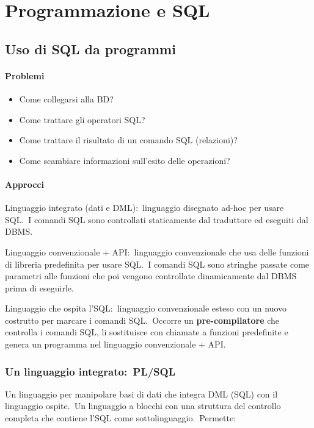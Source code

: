 \chapter{Programmazione e SQL}

\section{Uso di SQL da programmi}

\subsubsection{Problemi}

\begin{itemize}
	\item Come collegarsi alla BD?
	\item Come trattare gli operatori SQL?
	\item Come trattare il risultato di un comando SQL (relazioni)?
	\item Come scambiare informazioni sull'esito delle operazioni?
\end{itemize}

\subsubsection{Approcci}

Linguaggio integrato (dati e DML):\ linguaggio disegnato ad-hoc per usare SQL.\
I comandi SQL sono controllati staticamente dal traduttore ed eseguiti dal DBMS.

\noindent Linguaggio convenzionale + API:\ linguaggio convenzionale che usa delle funzioni di libreria predefinita per usare SQL.\
I comandi SQL sono stringhe passate come parametri alle funzioni che poi vengono controllate dinamicamente dal DBMS prima di eseguirle.

\noindent Linguaggio che ospita l'SQL:\ linguaggio convenzionale esteso con un nuovo costrutto per marcare i comandi SQL.\
Occorre un \textbf{pre-compilatore} che controlla i comandi SQL, li sostituisce con chiamate a funzioni predefinite e genera un programma nel linguaggio convenzionale + API.

\subsection{Un linguaggio integrato:\ PL/SQL}

Un linguaggio per manipolare basi di dati che integra DML (SQL) con il linguaggio ospite.\
Un linguaggio a blocchi con una struttura del controllo completa che contiene l'SQL come sottolinguaggio.\
Permette:

